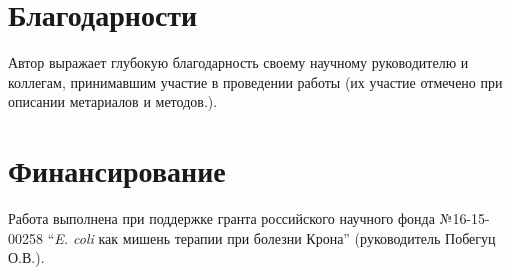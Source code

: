 \chapter{Благодарности}
Автор выражает глубокую благодарность своему научному руководителю и коллегам, принимавшим участие в проведении работы (их участие отмечено при описании метариалов и методов.). 


\chapter{Финансирование}
Работа выполнена при поддержке гранта российского научного фонда №16-15-00258 ``\textit{E. coli} как мишень терапии при болезни Крона'' (руководитель Побегуц О.В.).
